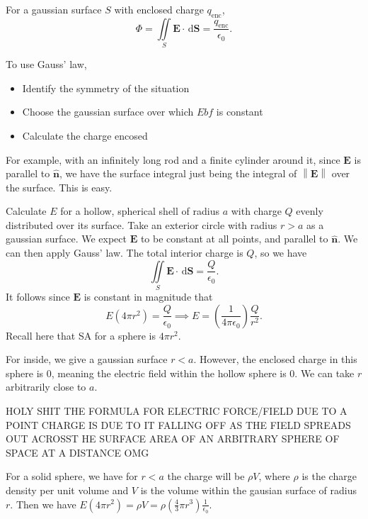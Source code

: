 
\begin{theorem}\label{thm:6}
	For a gaussian surface $S$ with enclosed charge $q_{\text{enc}}$,
	\[
		\Phi =\iint\limits_{S} \mathbf{E}\cdot  \,\mathrm{d} \mathbf{S}=\frac{q_{\text{enc}}}{\epsilon _0}
	.\]
\end{theorem}

To use Gauss' law,
\begin{itemize}
	\item Identify the symmetry of the situation
	\item Choose the gaussian surface over which $E bf$ is constant
	\item Calculate the charge encosed
\end{itemize}
For example, with an infinitely long rod and a finite cylinder around it, since $\mathbf{E}$ is parallel to $\mathbf{\hat{n}}$, we have the surface integral just being the integral of $\left\lVert \mathbf{E} \right\rVert $ over the surface. This is easy.

Calculate $E$ for a hollow, spherical shell of radius $a$ with charge $Q$ evenly distributed over its surface. Take an exterior circle with radius $r>a$ as a gaussian surface. We expect $\mathbf{E}$ to be constant at all points, and parallel to $\mathbf{\hat{n}}$. We can then apply Gauss' law. The total interior charge is $Q$, so we have
\[
	\iint\limits_{S} \mathbf{E}\cdot  \,\mathrm{d} \mathbf{S}=\frac{Q}{\epsilon _0}
.\]
It follows since $\mathbf{E}$ is constant in magnitude that
\[
	E\left( 4\pi r^2 \right) =\frac{Q}{\epsilon _0}\implies E=\left( \frac{1}{4\pi \epsilon _0} \right) \frac{Q}{r^2}
.\]
Recall here that SA for a sphere is $4\pi r^2$.

For inside, we give a gaussian surface $r<a$. However, the enclosed charge in this sphere is 0, meaning the electric field within the hollow sphere is 0. We can take $r$ arbitrarily close to $a$.

HOLY SHIT THE FORMULA FOR ELECTRIC FORCE/FIELD DUE TO A POINT CHARGE IS DUE TO IT FALLING OFF AS THE FIELD SPREADS OUT ACROSST HE SURFACE AREA OF AN ARBITRARY SPHERE OF SPACE AT A DISTANCE OMG

For a solid sphere, we have for $r<a$ the charge will be $\rho V$, where $\rho $ is the charge density per unit volume and $V$ is the volume within the gausian surface of radius $r$. Then we have $E(4\pi r^2)=\rho V=\rho \left( \frac{4}{3}\pi r^3 \right)\frac{1}{\epsilon _0} $.

